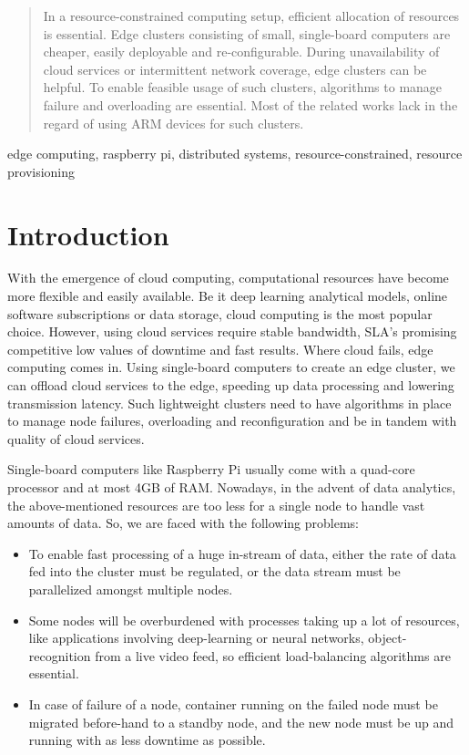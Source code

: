 \documentclass[conference]{IEEEtran}
\begin{document}
\begin{abstract}
In a resource-constrained computing setup, efficient allocation of resources is essential. Edge clusters consisting of small, single-board computers are cheaper, easily deployable and re-configurable. During unavailability of cloud services or intermittent network coverage, edge clusters can be helpful. To enable feasible usage of such clusters, algorithms to manage failure and overloading are essential. Most of the related works lack  in the regard of using ARM devices for such clusters.
\end{abstract}

\begin{IEEEkeywords}
edge computing, raspberry pi, distributed systems, resource-constrained, resource provisioning
\end{IEEEkeywords}

\section{Introduction}

With the emergence of cloud computing, computational resources have become more flexible and easily available. Be it deep learning analytical models, online software subscriptions or data storage, cloud computing is the most popular choice. However, using cloud services require stable bandwidth, SLA's promising competitive low values of downtime and fast results. Where cloud fails, edge computing comes in. Using single-board computers to create an edge cluster, we can offload cloud services to the edge, speeding up data processing and lowering transmission latency. Such lightweight clusters need to have algorithms in place to manage node failures, overloading and reconfiguration and be in tandem with quality of cloud services.

Single-board computers like Raspberry Pi usually come with a quad-core processor and at most 4GB of RAM. Nowadays, in the advent of data analytics, the above-mentioned resources are too less for a single node to handle vast amounts of data. So, we are faced with the following problems:
\begin{itemize}
    \item To enable fast processing of a huge in-stream of data, either the rate of data fed into the cluster must be regulated, or the data stream must be parallelized amongst multiple nodes.
    \item Some nodes will be overburdened with processes taking up a lot of resources, like applications involving deep-learning or neural networks, object-recognition from a live video feed, so efficient load-balancing algorithms are essential.
    \item In case of failure of a node, container running on the failed node must be migrated before-hand to a standby node, and the new node must be up and running with as less downtime as possible.
\end{itemize}
\end{document}
